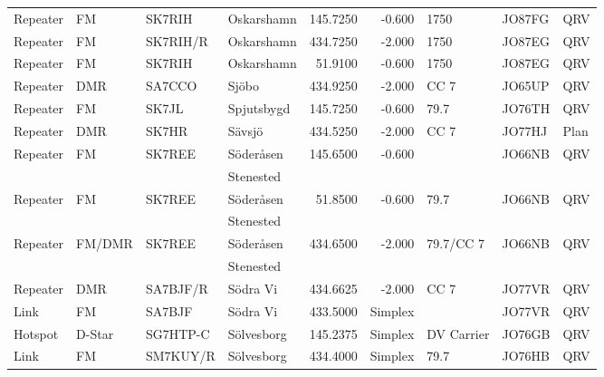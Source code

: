 \begin{longtable}{llllrrlll}
Repeater & FM              & SK7RIH   & Oskarshamn   & 145.7250     & -0.600     & 1750         & JO87FG      & QRV      \\
Repeater & FM              & SK7RIH/R & Oskarshamn   & 434.7250     & -2.000     & 1750         & JO87EG      & QRV      \\
Repeater & FM              & SK7RIH   & Oskarshamn   & 51.9100      & -0.600     & 1750         & JO87EG      & QRV      \\
Repeater & DMR             & SA7CCO   & Sjöbo        & 434.9250     & -2.000     & CC 7         & JO65UP      & QRV      \\
Repeater & FM              & SK7JL    & Spjutsbygd   & 145.7250     & -0.600     & 79.7         & JO76TH      & QRV      \\
Repeater & DMR             & SK7HR    & Sävsjö       & 434.5250     & -2.000     & CC 7         & JO77HJ      & Plan     \\
Repeater & FM              & SK7REE   & Söderåsen    & 145.6500     & -0.600     &              & JO66NB      & QRV      \\
         &                 &          & Stenested    &              &            &              &             &          \\
Repeater & FM              & SK7REE   & Söderåsen    & 51.8500      & -0.600     & 79.7         & JO66NB      & QRV      \\
         &                 &          & Stenested    &              &            &              &             &          \\
Repeater & FM/DMR          & SK7REE   & Söderåsen    & 434.6500     & -2.000     & 79.7/CC 7    & JO66NB      & QRV      \\
         &                 &          & Stenested    &              &            &              &             &          \\
Repeater & DMR             & SA7BJF/R & Södra Vi     & 434.6625     & -2.000     & CC 7         & JO77VR      & QRV      \\
Link     & FM              & SA7BJF   & Södra Vi     & 433.5000     & Simplex    &              & JO77VR      & QRV      \\
Hotspot  & D-Star          & SG7HTP-C & Sölvesborg   & 145.2375     & Simplex    & DV Carrier   & JO76GB      & QRV      \\
Link     & FM              & SM7KUY/R & Sölvesborg   & 434.4000     & Simplex    & 79.7         & JO76HB      & QRV      \\

\end{longtable}
